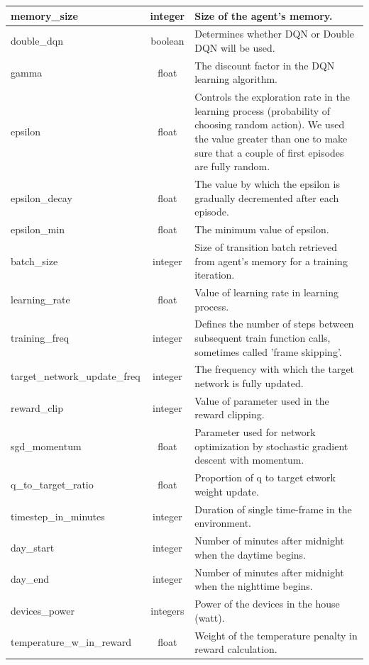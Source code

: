 \documentclass{article}
\begin{document}
{\begin{longtable}{l|c|p{9cm}}
    \hline
    memory\_size & integer & Size of the agent's memory.\\
    \hline
    double\_dqn & boolean & Determines whether DQN or Double DQN will  be used.\\
    \hline
    gamma & float & The discount factor in the DQN learning algorithm.\\
    \hline
    epsilon & float & Controls the exploration rate in the learning process (probability of choosing random action). We used the value greater than one to make sure that a couple of first episodes are fully random.\\
    \hline
    epsilon\_decay & float & The value by which the epsilon is gradually decremented after each episode.\\
    \hline
    epsilon\_min & float & The minimum value of epsilon.\\
    \hline
    batch\_size & integer & Size of transition batch retrieved from agent's memory for a training iteration.\\
    \hline
    learning\_rate & float & Value of learning rate in learning process.\\
    \hline
    training\_freq & integer & Defines the number of steps between subsequent train function calls, sometimes called 'frame skipping'.\\
    \hline
    target\_network\_update\_freq & integer & The frequency with which the target network is fully updated.\\
    \hline
    reward\_clip & integer & Value of parameter used in the reward clipping.\\
    \hline
    sgd\_momentum & float & Parameter used for network optimization by stochastic gradient descent with momentum.\\
    \hline
    q\_to\_target\_ratio & float & Proportion of q to target etwork weight update. \\
    \hline
    timestep\_in\_minutes & integer & Duration of single time-frame in the environment.\\
    \hline
    day\_start & integer & Number of minutes after midnight when the daytime begins.\\
    \hline
    day\_end & integer & Number of minutes after midnight when the nighttime begins.\\
    \hline
    devices\_power & integers & Power of the devices in the house (watt).\\
    \hline
    temperature\_w\_in\_reward & float & Weight of the temperature penalty in reward calculation.\\

\end{longtable}}
\end{document}
